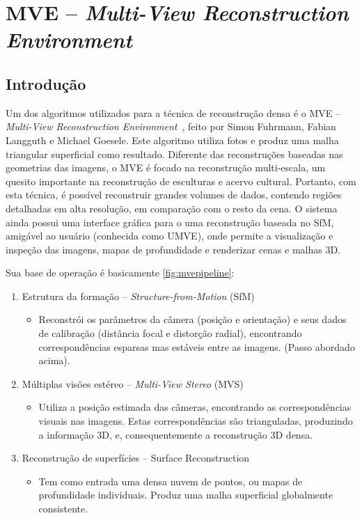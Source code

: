 \section{MVE -- \emph{Multi-View Reconstruction Environment}}\label{sec:mve}
%
\subsection{Introdução}
Um dos algoritmos utilizados para a técnica de reconstrução densa é o MVE -- \emph{Multi-View Reconstruction Environment}~\cite{mve}, feito por Simon Fuhrmann, Fabian Langguth e Michael Goesele. Este algoritmo utiliza fotos e produz uma malha triangular superficial como resultado. Diferente das reconstruções baseadas nas geometrias das imagens, o MVE é focado na reconstrução multi-escala, um quesito importante na reconstrução de esculturas e acervo cultural. Portanto, com esta técnica, é possível reconstruir grandes volumes de dados, contendo regiões detalhadas em alta resolução, em comparação com o resto da cena. O sistema ainda possui uma interface gráfica para o uma reconstrução baseada no SfM, amigável ao usuário (conhecida como UMVE), onde permite a visualização e inspeção das imagens, mapas de profundidade e renderizar cenas e malhas 3D.

Sua base de operação é basicamente \ref{fig:mvepipeline}:

\begin{enumerate}
\item{Estrutura da formação -- \emph{Structure-from-Motion} (SfM)}

\begin{itemize}
\item{
Reconstrói os parâmetros da câmera (posição e orientação) e seus dados de calibração (distância focal e distorção radial),
encontrando correspondências esparsas mas estáveis entre as imagens. (Passo abordado acima).
}
\end{itemize}

\item{Múltiplas visões estéreo -- \emph{Multi-View Stereo} (MVS)}
\begin{itemize}
\item{
Utiliza a posição estimada das câmeras, encontrando as correspondências visuais nas imagens. Estas correspondências são trianguladas, produzindo a informação 3D, e,
consequentemente a reconstrução 3D densa.
} 
\end{itemize}
\item{Reconstrução de superfícies -- {Surface Reconstruction}}
\begin{itemize}
\item{
Tem como entrada uma densa nuvem de pontos, ou mapas de profundidade individuais. Produz uma malha superficial globalmente consistente.
}
\end{itemize}
\end{enumerate}

